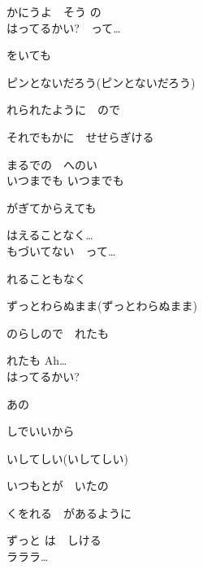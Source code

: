 かにうよ　そう の
\\

はってるかい?　って…

をいても

ピンとないだろう(ピンとないだろう)

れられたように　ので

それでもかに　せせらぎける

まるでの　へのい
\\

いつまでも いつまでも

がぎてからえても

はえることなく…
\\

もづいてない　って…

れることもなく

ずっとわらぬまま(ずっとわらぬまま)

のらしので　れたも

れたも Ah…
\\

はってるかい?

あの

しでいいから

いしてしい(いしてしい)

いつもとが　いたの

くをれる　があるように

ずっと は　しける
\\

ラララ…
\\
